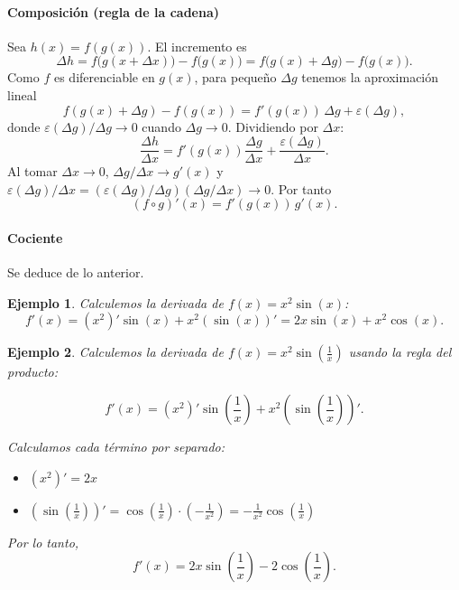 \documentclass[12pt, a4paper]{article}
\theoremstyle{rioplatense}
\newtheorem{ejemplo}{Ejemplo}[section]
\begin{document}

\paragraph{Composición (regla de la cadena)}
Sea \(h(x)=f(g(x))\). El incremento es
\[
\Delta h=f\big(g(x+\Delta x)\big)-f\big(g(x)\big)=f\big(g(x)+\Delta g\big)-f\big(g(x)\big).
\]
Como \(f\) es diferenciable en \(g(x)\), para pequeño \(\Delta g\) tenemos la aproximación lineal
\[
f(g(x)+\Delta g)-f(g(x))=f'(g(x))\,\Delta g+\varepsilon(\Delta g),
\]
donde \(\varepsilon(\Delta g)/\Delta g\to0\) cuando \(\Delta g\to0\). Dividiendo por \(\Delta x\):
\[
\frac{\Delta h}{\Delta x}=f'(g(x))\frac{\Delta g}{\Delta x}+\frac{\varepsilon(\Delta g)}{\Delta x}.
\]
Al tomar \(\Delta x\to0\), \(\Delta g/\Delta x\to g'(x)\) y \(\varepsilon(\Delta g)/\Delta x=(\varepsilon(\Delta g)/\Delta g)(\Delta g/\Delta x)\to0\). Por tanto
\[
(f\circ g)'(x)=f'(g(x))\,g'(x).
\]

\paragraph{Cociente} Se deduce de lo anterior.

\begin{ejemplo}
    Calculemos la derivada de $f(x) = x^2 \sin(x)$:
    $$
    f'(x) = (x^2)' \sin(x) + x^2 (\sin(x))' = 2x \sin(x) + x^2 \cos(x).
    $$
\end{ejemplo}

\begin{ejemplo}
Calculemos la derivada de $f(x) = x^2 \sin\left(\frac{1}{x}\right)$ usando la regla del producto:

$$
f'(x) = (x^2)' \sin\left(\frac{1}{x}\right) + x^2 \left(\sin\left(\frac{1}{x}\right)\right)'.
$$

Calculamos cada término por separado:
\begin{itemize}
    \item $(x^2)' = 2x$
    \item $\displaystyle \left(\sin\left(\frac{1}{x}\right)\right)' = \cos\left(\frac{1}{x}\right) \cdot \left(-\frac{1}{x^2}\right) = -\frac{1}{x^2} \cos\left(\frac{1}{x}\right)$
\end{itemize}
Por lo tanto,
$$
f'(x) = 2x \sin\left(\frac{1}{x}\right) - 2 \cos\left(\frac{1}{x}\right).
$$
\end{ejemplo}
\end{document}
